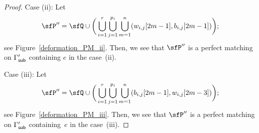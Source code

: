\begin{proof}
Case (ii): Let \begin{gather*}%
\sfP^{\prime\prime}=\sfQ \cup \bigg(\bigcup_{i=1}^r \bigcup_{j=1}^{p_i} \bigcup_{m=1}^n(w_{i,j}[2m-1],b_{i,j}[2m-1])\bigg);
\end{gather*}
see Figure~\ref{deformation_PM_ii}. Then, we see that $\sfP^{\prime\prime}$ is a perfect matching on $\Gamma^\prime_{\sf sub}$ containing $e$ in the case~(ii).

Case (iii): Let \begin{displaymath}
\sfP^{\prime\prime}=\sfQ \cup \bigg(\bigcup_{i=1}^r \bigcup_{j=1}^{p_i} \bigcup_{m=1}^n(b_{i,j}[2m-1],w_{i,j}[2m-3])\bigg); \end{displaymath}
see Figure~\ref{deformation_PM_iii}. Then, we see that $\sfP^{\prime\prime}$ is a perfect matching on $\Gamma^\prime_{\sf sub}$ containing~$e$ in the case~(iii).


\end{proof}

